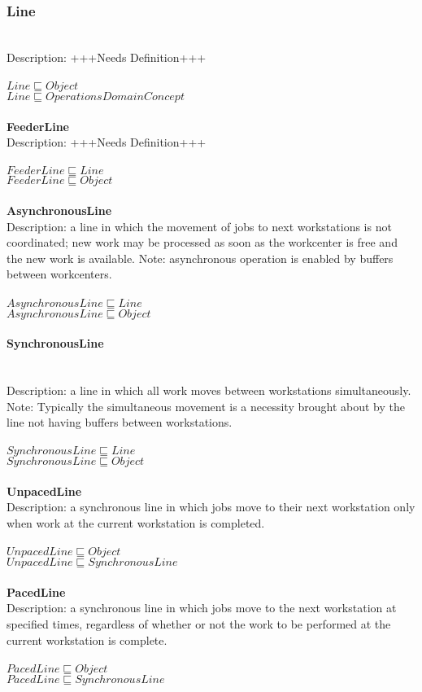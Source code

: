 \subsubsection{Line}\\
Description: +++Needs Definition+++\\
\\$ Line \sqsubseteq Object$
\\$ Line \sqsubseteq OperationsDomainConcept$
\\\\   \textbf{FeederLine}\\Description: +++Needs Definition+++\\
\\$ FeederLine \sqsubseteq Line$
\\$ FeederLine \sqsubseteq Object$
\\\\   \textbf{AsynchronousLine}\\Description: a line in which the movement of jobs to next workstations is not coordinated; new work may be processed as soon as the workcenter is free and the new work is available. Note: asynchronous operation is enabled by buffers between workcenters.\\
\\$ AsynchronousLine \sqsubseteq Line$
\\$ AsynchronousLine \sqsubseteq Object$
\paragraph{SynchronousLine}\\
Description: a line in which all work moves between workstations simultaneously. Note: Typically the simultaneous movement is a necessity brought about by the line not having buffers between workstations.\\
\\$ SynchronousLine \sqsubseteq Line$
\\$ SynchronousLine \sqsubseteq Object$
\\\\   \textbf{UnpacedLine}\\Description: a synchronous line in which jobs move to their next workstation only when work at the current workstation is completed.\\
\\$ UnpacedLine \sqsubseteq Object$
\\$ UnpacedLine \sqsubseteq SynchronousLine$
\\\\   \textbf{PacedLine}\\Description: a synchronous line in which jobs move to the next workstation at specified times, regardless of whether or not the work to be performed at the current workstation is complete.\\
\\$ PacedLine \sqsubseteq Object$
\\$ PacedLine \sqsubseteq SynchronousLine$
